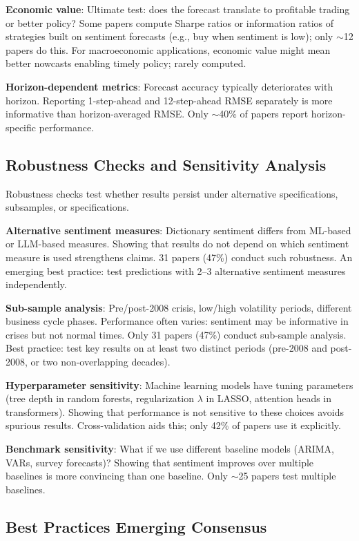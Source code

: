 \textbf{Economic value}: Ultimate test: does the forecast translate to profitable trading or better policy? Some papers compute Sharpe ratios or information ratios of strategies built on sentiment forecasts (e.g., buy when sentiment is low); only $\sim$12 papers do this. For macroeconomic applications, economic value might mean better nowcasts enabling timely policy; rarely computed.

\textbf{Horizon-dependent metrics}: Forecast accuracy typically deteriorates with horizon. Reporting 1-step-ahead and 12-step-ahead RMSE separately is more informative than horizon-averaged RMSE. Only $\sim$40\% of papers report horizon-specific performance.

\subsection{Robustness Checks and Sensitivity Analysis}

Robustness checks test whether results persist under alternative specifications, subsamples, or specifications.

\textbf{Alternative sentiment measures}: Dictionary sentiment differs from ML-based or LLM-based measures. Showing that results do not depend on which sentiment measure is used strengthens claims. 31 papers (47\%) conduct such robustness. An emerging best practice: test predictions with 2--3 alternative sentiment measures independently.

\textbf{Sub-sample analysis}: Pre/post-2008 crisis, low/high volatility periods, different business cycle phases. Performance often varies: sentiment may be informative in crises but not normal times. Only 31 papers (47\%) conduct sub-sample analysis. Best practice: test key results on at least two distinct periods (pre-2008 and post-2008, or two non-overlapping decades).

\textbf{Hyperparameter sensitivity}: Machine learning models have tuning parameters (tree depth in random forests, regularization $\lambda$ in LASSO, attention heads in transformers). Showing that performance is not sensitive to these choices avoids spurious results. Cross-validation aids this; only 42\% of papers use it explicitly.

\textbf{Benchmark sensitivity}: What if we use different baseline models (ARIMA, VARs, survey forecasts)? Showing that sentiment improves over multiple baselines is more convincing than one baseline. Only $\sim$25 papers test multiple baselines.

\subsection{Best Practices Emerging Consensus}


